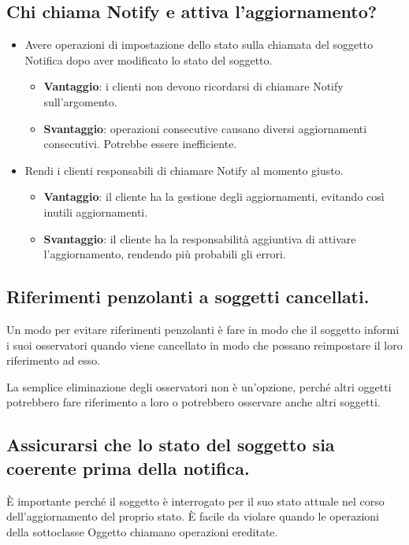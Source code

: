 \subsection{Chi chiama Notify e attiva l'aggiornamento?}

\begin{itemize}
    \item Avere operazioni di impostazione dello stato sulla chiamata del soggetto Notifica dopo aver modificato lo stato del soggetto. 
        
    \begin{itemize}
        \item \textbf{Vantaggio}: i clienti non devono ricordarsi di chiamare Notify sull'argomento.

        \item \textbf{Svantaggio}: operazioni consecutive causano diversi aggiornamenti consecutivi. Potrebbe essere inefficiente.
    \end{itemize}

    \item Rendi i clienti responsabili di chiamare Notify al momento giusto.

    \begin{itemize}
        \item \textbf{Vantaggio}: il cliente ha la gestione degli aggiornamenti, evitando così inutili aggiornamenti. 

        \item \textbf{Svantaggio}: il cliente ha la responsabilità aggiuntiva di attivare l'aggiornamento, rendendo più probabili gli errori.
    \end{itemize}
\end{itemize}


\subsection{Riferimenti penzolanti a soggetti cancellati.}
Un modo per evitare riferimenti penzolanti è fare in modo che il soggetto informi i suoi osservatori quando viene cancellato in modo che possano reimpostare il loro riferimento ad esso.

La semplice eliminazione degli osservatori non è un'opzione, perché altri oggetti potrebbero fare riferimento a loro o potrebbero osservare anche altri soggetti.

\subsection{Assicurarsi che lo stato del soggetto sia coerente prima della notifica.}
È importante perché il soggetto è interrogato per il suo stato attuale nel corso dell'aggiornamento del proprio stato.
È facile da violare quando le operazioni della sottoclasse Oggetto chiamano operazioni ereditate.

